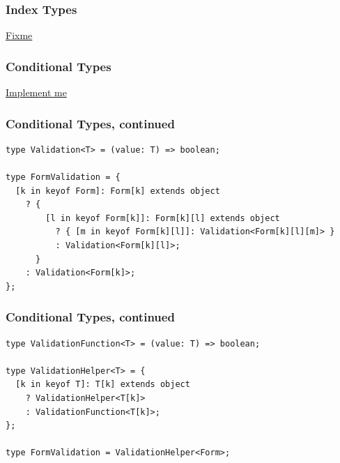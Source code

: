 \documentclass[aspectratio=169]{beamer}
\begin{document}
\begin{frame}
  \frametitle{Index Types}

  \href{https://bit.ly/3dVMzgx}{Fixme}
\end{frame}

\begin{frame}[fragile]
  \frametitle{Conditional Types}

  \href{https://bit.ly/3dXnfGX}{Implement me}
\end{frame}

\begin{frame}[fragile]
  \frametitle{Conditional Types, continued}

  \begin{verbatim}
type Validation<T> = (value: T) => boolean;

type FormValidation = {
  [k in keyof Form]: Form[k] extends object
    ? {
        [l in keyof Form[k]]: Form[k][l] extends object
          ? { [m in keyof Form[k][l]]: Validation<Form[k][l][m]> }
          : Validation<Form[k][l]>;
      }
    : Validation<Form[k]>;
};
\end{verbatim}
\end{frame}

\begin{frame}[fragile]
  \frametitle{Conditional Types, continued}

  \begin{verbatim}
type ValidationFunction<T> = (value: T) => boolean;

type ValidationHelper<T> = {
  [k in keyof T]: T[k] extends object
    ? ValidationHelper<T[k]>
    : ValidationFunction<T[k]>;
};

type FormValidation = ValidationHelper<Form>;
\end{verbatim}
\end{frame}
\end{document}
